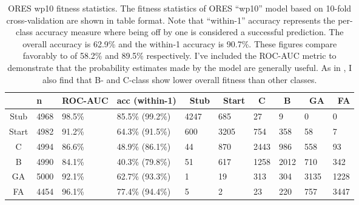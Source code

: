 \begin{table*}
\centering
\caption{ORES wp10 fitness statistics. The fitness statistics of ORES ``wp10'' model based on 10-fold cross-validation are shown in table format.  Note that ``within-1'' accuracy represents the per-class accuracy measure where being off by one is considered a successful prediction.  The overall accuracy is 62.9\% and the within-1 accuracy is 90.7\%.  These figures compare favorably to \protect\cite{wang15success} of 58.2\% and 89.5\% respectively.  I've included the ROC-AUC metric to demonstrate that the probability estimates made by the model are generally useful.  As in \protect\cite{wang15success}, I also find that B- and C-class show lower overall fitness than other classes.}
\begin{tabular}{|c|l|l|l||l|l|l|l|l|l|} \hline
& n & ROC-AUC & acc (within-1) & ~Stub & ~Start & ~C & ~B & ~GA & ~FA \\ \hline 
Stub & 4968 & 98.5\% & 85.5\% (99.2\%)
& \cellcolor{green!25}4247
& \cellcolor{yellow!25}685 & 27 & 9 & 0 & 0 \\ \hline
Start & 4982 & 91.2\% & 64.3\% (91.5\%)
& \cellcolor{yellow!25}600
& \cellcolor{green!25}3205
& \cellcolor{yellow!25}754 & 358 & 58 & 7 \\ \hline
C & 4994 & 86.6\% & 48.9\% (86.1\%) & 44
& \cellcolor{yellow!25}870
& \cellcolor{green!25}2443
& \cellcolor{yellow!25}986 & 558 & 93 \\ \hline
B & 4990 & 84.1\% & 40.3\% (79.8\%) & 51 & 617
& \cellcolor{yellow!25}1258
& \cellcolor{green!25}2012
& \cellcolor{yellow!25}710 & 342 \\ \hline
GA & 5000 & 92.1\% & 62.7\% (93.3\%) & 1 & 19 & 313
& \cellcolor{yellow!25}304
& \cellcolor{green!25}3135
& \cellcolor{yellow!25}1228 \\ \hline
FA & 4454 & 96.1\% & 77.4\% (94.4\%) & 5 & 2 & 23 & 220
& \cellcolor{yellow!25}757
& \cellcolor{green!25}3447 \\ \hline
\end{tabular}
\label{tab:fitness_statistics}
\end{table*}
